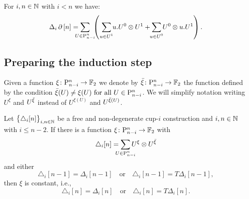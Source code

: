 \begin{proposition} \label{p:fact}
	For $i,n \in \mathbb{N}$ with $i < n$ we have:
	\[
	\Delta_i \bd \, [n] =
	\sum_{\mathclap{U \in \P_{n-i}^n}} \
	\left(\
	\sum_{\mathclap{u \in U^1}} u.U^0 \ot U^1 +
	\sum_{\mathclap{u \in U^0}} U^0 \ot u.U^1
	\right).
	\]
\end{proposition}

\subsection{Preparing the induction step} \label{ss:preparing}

\begin{notation*}
	Given a function $\xi \colon \mathrm{P}_{n-i}^n \to {\mathbb{F}_2}$ we denote by ${\bar{\xi}} \colon \mathrm{P}_{n-i}^n \to {\mathbb{F}_2}$ the function defined by the condition ${\bar{\xi}}(U) \neq \xi(U) \text{ for all } U \in \mathrm{P}_{n-i}^n$.
	We will simplify notation writing $U^\xi$ and $U^{{\bar{\xi}}}$ instead of $U^{\xi(U)}$ and $U^{{\bar{\xi}}(U)}$.
\end{notation*}

\begin{lemma} \label{l:first nail}
	Let $\big\{ \triangle_i [n] \big\}_{i,n\in\mathbb{N}}$ be a free and non-degenerate \mbox{cup-$i$} construction and $i,n \in \mathbb{N}$ with $i \leq n-2$.
	If there is a function $\xi \colon \mathrm{P}_{n-i}^n \to {\mathbb{F}_2}$ with
	\begin{equation} \label{e:xi and barxi}
	\triangle_i [n] =
	\sum_{\mathclap{U \in \P_{n-i}^n}} U^{\xi} \ot U^{\barxi}
	\end{equation}
	and either
	\[
	\triangle_i [n-1] = \Delta_i [n-1]
	\quad \text{or} \quad
	\triangle_i [n-1] = T\Delta_i [n-1],
	\]
	then $\xi$ is constant, i.e.,
	\[
	\triangle_i [n] = \Delta_i [n]
	\quad \text{or} \quad
	\triangle_i [n] = T \Delta_i [n].
	\]
\end{lemma}

